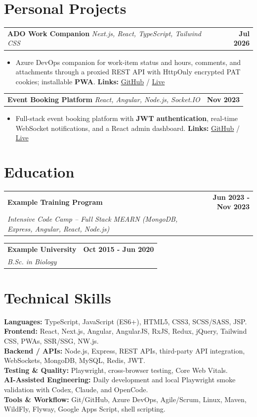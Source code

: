 \documentclass[letterpaper,10pt]{article}
\makeatletter
\newlength{\cvProjectGap}
\newlength{\cvEducationGap}
\newlength{\cvEducationToSectionAdjust}
\newcommand{\resumeProjectHeading}[2]{%
  \noindent
  \begin{tabularx}{\textwidth}{@{}Xr@{}}
    #1 & \textbf{#2} \\
  \end{tabularx}\par
}
\newcommand{\resumeEducationHeading}[4]{%
  \noindent
  \begin{tabularx}{\textwidth}{@{}Xr@{}}
    \textbf{#1} & \textbf{#2} \\
    \textit{#3} & \textit{#4} \\
  \end{tabularx}\par
}
\newcommand{\resumeItem}[1]{\item #1}
\newcommand{\resumeItemListStart}{%
  \begin{itemize}[
    leftmargin=1.15em,
    label=\textbullet,
    labelsep=0.45em,
    itemsep=1pt,
    parsep=0pt,
    partopsep=0pt,
    topsep=1pt
  ]
}
\newcommand{\resumeItemListEnd}{\end{itemize}}
\makeatother
\begin{document}
\section{Personal Projects}
\resumeProjectHeading
  {\textbf{ADO Work Companion} \textbar{} \textit{Next.js, React, TypeScript, Tailwind CSS}}{Jul 2026}
\resumeItemListStart
  \resumeItem{Azure DevOps companion for work-item status and hours, comments, and attachments through a proxied REST API with HttpOnly encrypted PAT cookies; installable \textbf{PWA}. \textbf{Links:} \href{https://github.com/example-candidate/azure-devOps-work-item-management}{GitHub} / \href{https://azure-dev-ops-work-item-management.vercel.app/dashboard}{Live}}
\resumeItemListEnd
\vspace{\cvProjectGap}
\resumeProjectHeading
  {\textbf{Event Booking Platform} \textbar{} \textit{React, Angular, Node.js, Socket.IO}}{Nov 2023}
\resumeItemListStart
  \resumeItem{Full-stack event booking platform with \textbf{JWT authentication}, real-time WebSocket notifications, and a React admin dashboard. \textbf{Links:} \href{https://github.com/example-org/event-booking-platform/}{GitHub} / \href{https://example-events.app/}{Live}}
\resumeItemListEnd

\section{Education}
\resumeEducationHeading
  {Example Training Program}{Jun 2023 - Nov 2023}
  {Intensive Code Camp -- Full Stack MEARN (MongoDB, Express, Angular, React, Node.js)}{}
\vspace{\cvEducationGap}
\resumeEducationHeading
  {Example University}{Oct 2015 - Jun 2020}
  {B.Sc. in Biology}{}
\vspace{\cvEducationToSectionAdjust}
\section{Technical Skills}
\textbf{Languages:} TypeScript, JavaScript (ES6+), HTML5, CSS3, SCSS/SASS, JSP. \\
\textbf{Frontend:} React, Next.js, Angular, AngularJS, RxJS, Redux, jQuery, Tailwind CSS, PWAs, SSR/SSG, NW.js. \\
\textbf{Backend / APIs:} Node.js, Express, REST APIs, third-party API integration, WebSockets, MongoDB, MySQL, Redis, JWT. \\
\textbf{Testing \& Quality:} Playwright, cross-browser testing, Core Web Vitals. \\
\textbf{AI-Assisted Engineering:} Daily development and local Playwright smoke validation with Codex, Claude, and OpenCode. \\
\textbf{Tools \& Workflow:} Git/GitHub, Azure DevOps, Agile/Scrum, Linux, Maven, WildFly, Flyway, Google Apps Script, shell scripting.
\end{document}
